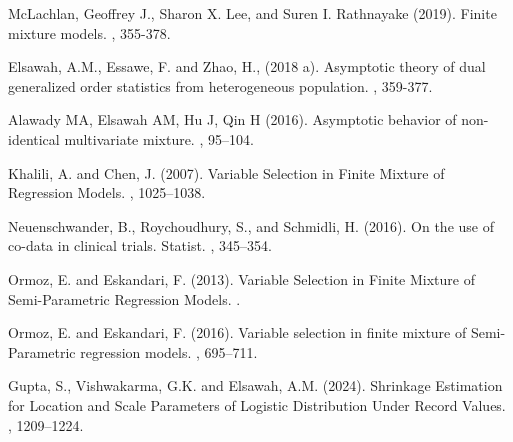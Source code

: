 %
%

\newpage
\begin{thebibliography}{}
	
McLachlan, Geoffrey J., Sharon X. Lee, and Suren I. Rathnayake (2019).
\newblock Finite mixture models.
,
355-378.

Elsawah, A.M., Essawe, F. and Zhao, H., (2018 a).
\newblock Asymptotic theory of dual generalized order statistics from heterogeneous population.
,
359-377.


Alawady MA, Elsawah AM, Hu J, Qin H (2016).
\newblock Asymptotic behavior of non-identical multivariate mixture.
,
95–104.


Khalili, A. and Chen, J. (2007).
\newblock  Variable Selection in Finite Mixture of Regression Models.
,
1025--1038.	


Neuenschwander, B., Roychoudhury, S., and Schmidli, H. (2016).
\newblock On the use of co-data in clinical trials. Statist.
,
345--354.



Ormoz, E. and Eskandari, F. (2013).
\newblock Variable Selection in Finite Mixture of Semi-Parametric Regression Models.
.


Ormoz, E. and Eskandari, F. (2016).
\newblock Variable selection in finite mixture of Semi-Parametric regression models.
,
695--711.

Gupta, S., Vishwakarma, G.K. and Elsawah, A.M. (2024).
\newblock Shrinkage Estimation for Location and Scale Parameters of Logistic Distribution Under Record Values.
,
1209–1224.


\end{thebibliography}
